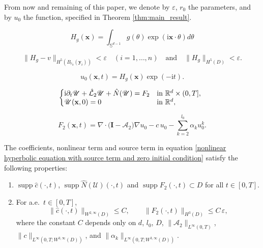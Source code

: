 \documentclass[10pt,a4paper]{amsart}
\begin{document}
	\begin{remark}\label{cf 3.5}
		From now and remaining of this paper, we denote by $\varepsilon$, $r_0$ the parameters, and by $u_0$ the function, specified in Theorem \ref{thm:main_result}.
	\end{remark}

		\begin{equation}\label{eq Hg}
			H_g(\mathbf{x}) = \int_{\mathbb{S}^{d-1}} g(\theta) \exp(\mathrm{i} \mathbf{x} \cdot \theta)  d\theta
		\end{equation}

		\begin{equation}\label{important estimate for H_g}
			\| H_g - v \|_{H^5(B_{r_0}(\mathbf{y}_i))} < \varepsilon \quad (i=1,\dots,n) \quad \text{and} \quad \| H_g \|_{H^5(D)} < \varepsilon.
		\end{equation}

		\begin{equation}\label{u_0}
			u_0(\mathbf{x},t) = H_g(\mathbf{x}) \exp(-\mathrm{i}  t).
		\end{equation}

	\begin{equation}\label{nonlinear hyperbolic equation with source term and zero initial condition}
		\left\{
		\begin{array}{@{}l@{\quad}l}
			\mathrm{i}\partial_t \mathscr{U}+\hat{\mathcal{L}}_2 \mathscr{U} + \hat{N}(\mathscr{U}) = F_2 & \text{in } \mathbb{R}^d \times (0,T], \\
			\mathscr{U}(\mathbf{x},0) = 0 & \text{in } \mathbb{R}^{d},
		\end{array}
		\right.
	\end{equation}

	\begin{equation}\label{eq:F2}
		F_2(\mathbf{x},t)
		= \nabla\cdot\big(\mathbf{I}-\mathscr{A}_2\big)\nabla u_0
		- c\,u_0 - \sum_{k=2}^{l_0}\alpha_k u_0^k.
	\end{equation}

	\begin{lemma}\label{Lemma 5.1}
		The coefficients, nonlinear term and source term in equation \eqref{nonlinear hyperbolic equation with source term and zero initial condition} satisfy the following properties:
		\begin{enumerate}
			\item $\operatorname{supp}\hat{c}(\cdot,t)$, $\operatorname{supp}\hat{N}(\mathscr{U})(\cdot,t)$
			and $\operatorname{supp}F_2(\cdot,t)\subset D$ for all $t\in[0,T]$.
			
			\item For a.e.\ $t\in[0,T]$,
			\[
			\|\hat{c}(\cdot,t)\|_{W^{2,\infty}(D)}\le C,\qquad
			\|F_2(\cdot,t)\|_{H^{3}(D)} \le C\,\varepsilon,
			\]
			where the constant $C$ depends only on $d$, $l_0$, $D$, $\|\mathscr{A}_2\|_{L^\infty(0,T)}$,
			$\|c\|_{L^\infty(0,T;W^{3,\infty}(D))}$, and $\|\alpha_k\|_{L^\infty(0,T;W^{3,\infty}(D))}$.
		\end{enumerate}
	\end{lemma}
\end{document}
